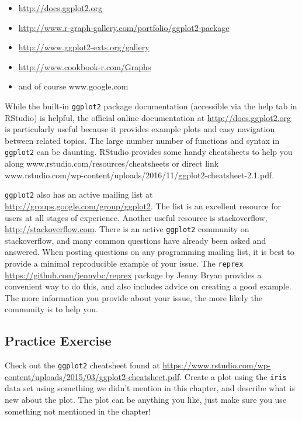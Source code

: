 \documentclass[]{krantz}
\providecommand{\tightlist}{%
  \setlength{\itemsep}{0pt}\setlength{\parskip}{0pt}}
\begin{document}
\begin{itemize}
\tightlist
\item
  \url{http://docs.ggplot2.org}
\item
  \url{http://www.r-graph-gallery.com/portfolio/ggplot2-package}
\item
  \url{http://www.ggplot2-exts.org/gallery}
\item
  \url{http://www.cookbook-r.com/Graphs}
\item
  and of course www.google.com
\end{itemize}

While the built-in \texttt{ggplot2} package documentation (accessible
via the help tab in RStudio) is helpful, the official online
documentation at \url{http://docs.ggplot2.org} is particularly useful
because it provides example plots and easy navigation between related
topics. The large number number of functions and syntax in
\texttt{ggplot2} can be daunting. RStudio provides some handy
cheatsheets to help you along www.rstudio.com/resources/cheatsheets or
direct link
www.rstudio.com/wp-content/uploads/2016/11/ggplot2-cheatsheet-2.1.pdf.

\texttt{ggplot2} also has an active mailing list at
\url{http://groups.google.com/group/ggplot2}. The list is an excellent
resource for users at all stages of experience. Another useful resource
is stackoverflow, \url{http://stackoverflow.com}. There is an active
\texttt{ggplot2} community on stackoverflow, and many common questions
have already been asked and answered. When posting questions on any
programming mailing list, it is best to provide a minimal reproducible
example of your issue. The \texttt{reprex}
\url{https://github.com/jennybc/reprex} package by Jenny Bryan provides
a convenient way to do this, and also includes advice on creating a good
example. The more information you provide about your issue, the more
likely the community is to help you.

\subsection{Practice Exercise}\label{practice-exercise-5}

Check out the \texttt{ggplot2} cheatsheet found at
\url{https://www.rstudio.com/wp-content/uploads/2015/03/ggplot2-cheatsheet.pdf}.
Create a plot using the \texttt{iris} data set using something we didn't
mention in this chapter, and describe what is new about the plot. The
plot can be anything you like, just make sure you use something not
mentioned in the chapter!
\end{document}

